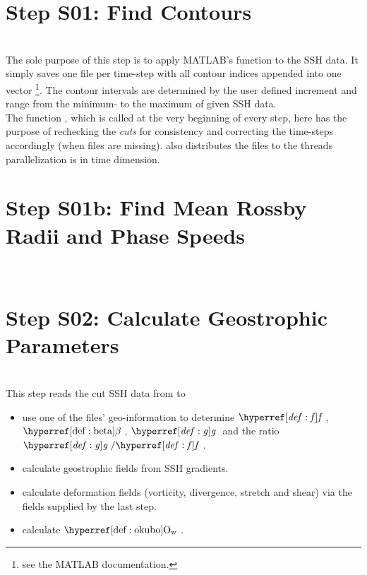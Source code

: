 
 \section{Step S01: Find Contours}
\\
The sole purpose of this step is to apply MATLAB's  function
to the SSH data. It simply saves one file per time-step with all contour indices
appended into one vector \footnote{see the MATLAB documentation.}. The contour
intervals are determined by the user defined increment and range from the
minimum- to the maximum of given SSH data. \\
The function , which is called at the very beginning of
every step, here has the purpose of rechecking the \textit{cuts} for
consistency and correcting the time-steps accordingly (\ie when files are
missing).  also distributes the files to the threads \ie
parallelization is in time dimension.
\section{Step S01b: Find Mean Rossby Radii and Phase Speeds}
\\


\section{Step S02: Calculate Geostrophic Parameters}
\\ 
This step reads the cut SSH data from  to
\begin{itemize}
	\item  use one of the files' geo-information to determine $\f$, $\dfdy$,
$\g$ and the ratio $\g/\f$.
\item
 calculate geostrophic fields from SSH gradients.
 \item
 calculate deformation fields (vorticity, divergence, stretch and shear) via the
fields supplied by the last step.
\item calculate $\okubo$.
\end{itemize}


